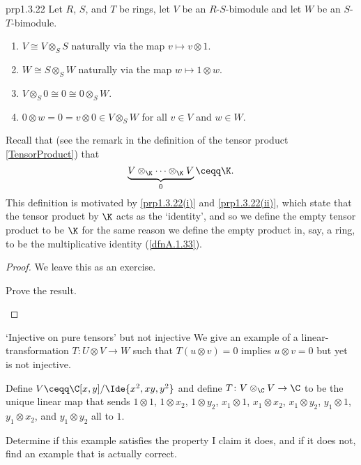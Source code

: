 \begin{prp}{}{prp1.3.22}
	Let $R$, $S$, and $T$ be rings, let $V$ be an $R$-$S$-bimodule and let $W$ be an $S$-$T$-bimodule.
	\begin{enumerate}
		\item \label{prp1.3.22(i)}$V\cong V\otimes _SS$ naturally via the map $v\mapsto v\otimes 1$.
		\item \label{prp1.3.22(ii)}$W\cong S\otimes _SW$ naturally via the map $w\mapsto 1\otimes w$.
		\item \label{prp1.3.22(iii)}$V\otimes _S0\cong 0\cong 0\otimes _SW$.
		\item \label{prp1.3.22(iv)}$0\otimes w=0=v\otimes 0\in V\otimes _SW$ for all $v\in V$ and $w\in W$.
	\end{enumerate}
	\begin{rmk}
		Recall that (see the remark in the definition of the tensor product \cref{TensorProduct}) that
		\begin{equation}
			\underbrace{V\otimes _{\K}\cdots \otimes _{\K}V}_0\ceqq \K .
		\end{equation}
		This definition is motivated by \cref{prp1.3.22(i)} and \cref{prp1.3.22(ii)}, which state that the tensor product by $\K$ acts as the `identity', and so we define the empty tensor product to be $\K$ for the same reason we define the empty product in, say, a ring, to be the multiplicative identity (\cref{dfnA.1.33}).
	\end{rmk}
	\begin{proof}
		We leave this as an exercise.
		\begin{exr}[breakable=false]{}{}
			Prove the result.
		\end{exr}
	\end{proof}
\end{prp}

\begin{exm}{`Injective on pure tensors' but not injective}{}
	We give an example of a linear-transformation $T\colon U\otimes V\rightarrow W$ such that $T(u\otimes v)=0$ implies $u\otimes v=0$ but yet is not injective.
	
	Define $V\ceqq \C [x,y]/\Ide{x^2,xy,y^2}$ and define $T\colon V\otimes _{\C}V\rightarrow \C$ to be the unique linear map that sends $1\otimes 1$, $1\otimes x_2$, $1\otimes y_2$, $x_1\otimes 1$, $x_1\otimes x_2$, $x_1\otimes y_2$, $y_1\otimes 1$, $y_1\otimes x_2$, and $y_1\otimes y_2$ all to $1$.
	\begin{exr}[breakable=false]{}{}
		Determine if this example satisfies the property I claim it does, and if it does not, find an example that is actually correct.
	\end{exr}
\end{exm}

